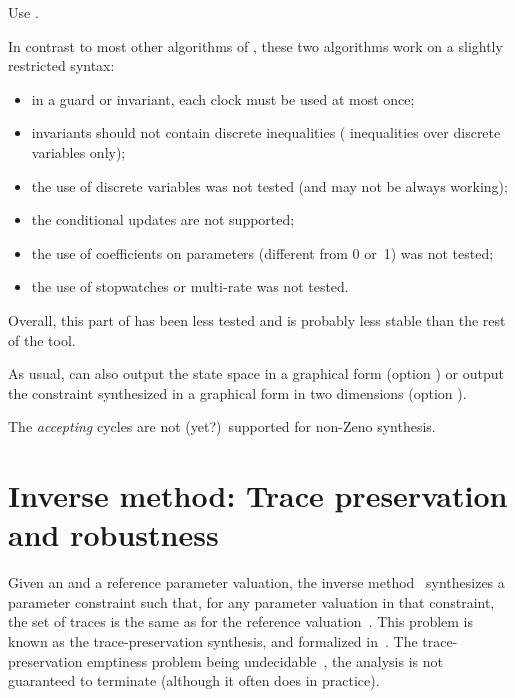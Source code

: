 	      Use .

\begin{becareful}[restrictions]
	In contrast to most other algorithms of \imitator{}, these two algorithms work on a slightly restricted syntax:
	\begin{itemize}
		\item in a guard or invariant, each clock must be used at most once;
		\item invariants should not contain discrete inequalities (\ie{} inequalities over discrete variables only);
		\item the use of discrete variables was not tested (and may not be always working);
		\item the conditional updates are not supported;
		\item the use of coefficients on parameters (different from 0 or~1) was not tested;
		\item the use of stopwatches or multi-rate was not tested.
	\end{itemize}
	Overall, this part of \imitator{} has been less tested and is probably less stable than the rest of the tool.
\end{becareful}

As usual, \imitator{} can also
output the state space in a graphical form (option )
or
output the constraint synthesized in a graphical form in two dimensions (option ).

\begin{remark}
	The \emph{accepting} cycles are not (yet?)\ supported for non-Zeno synthesis.
\end{remark}



\section{Inverse method: Trace preservation and robustness}\label{ss:mode:IM}

Given an \NIPTA{} and a reference parameter valuation, the inverse method~\IM{} synthesizes a parameter constraint such that, for any parameter valuation in that constraint, the set of traces is the same as for the reference valuation~\cite{ACEF09}.
This problem is known as the trace-preservation synthesis, and formalized in~\cite{ALM20}.
The trace-preservation emptiness problem being undecidable~\cite{ALM20}, the analysis is not guaranteed to terminate (although it often does in practice).

